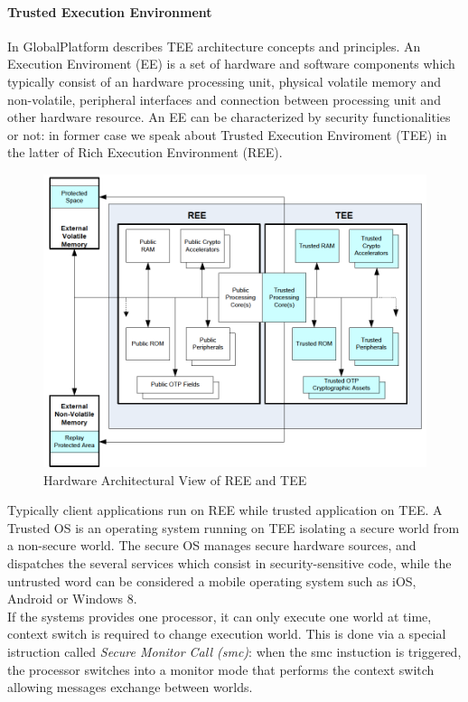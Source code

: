 \documentclass[../tesi.tex]{subfiles}
\begin{document}
\paragraph{Trusted Execution Environment}
In \cite{globalplatform2011TEE} GlobalPlatform describes TEE architecture concepts and principles. An Execution Enviroment (EE) is a set of hardware and software components which typically consist of an hardware processing unit, physical volatile memory and non-volatile, peripheral interfaces and connection between processing unit and other hardware resource. An EE can be characterized by security functionalities or not: in former case we speak about Trusted Execution Enviroment (TEE) in the latter of Rich Execution Environment (REE). 
\begin{figure}
\centering
\includegraphics[scale=0.33]{images/teearchitecture.png}
\caption{Hardware Architectural View of REE and TEE}
\label{fig:teearchitecture}
\end{figure}
Typically  client applications run on REE while trusted application on TEE. A Trusted OS is an operating system running on TEE isolating a secure world from a non-secure world. The secure OS manages secure hardware sources, and dispatches the several services which consist in security-sensitive code, while the untrusted word can be considered a mobile operating system such as iOS, Android or Windows 8. \\
If the systems provides one processor, it can only execute one world at time, context switch is required to change execution world. This is done via a special istruction called \emph{Secure Monitor Call (smc)}: when the smc instuction is triggered, the processor switches into a monitor mode that performs the context switch allowing messages exchange between worlds. 
\end{document}
